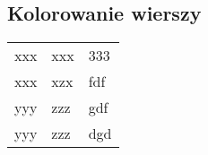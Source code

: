 \documentclass{article}
\begin{document}
\subsection{Kolorowanie wierszy}

\begin{center}
\begin{tabular}{lll}
xxx     & xxx   & 333 \\
xxx    & xzx  & fdf\\
yyy     & zzz   & gdf \\
yyy    & zzz  & dgd\\
\end{tabular}
\end{center}
\end{document}
